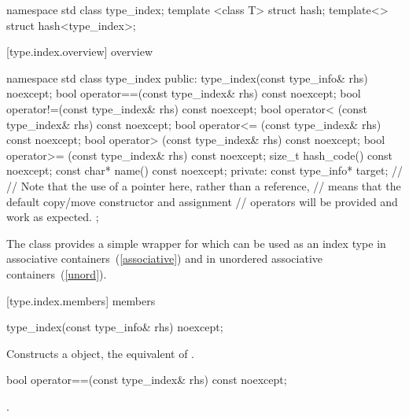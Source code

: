 %
%
\begin{codeblock}
namespace std {
  class type_index;
  template <class T> struct hash;
  template<> struct hash<type_index>;
}
\end{codeblock}

[type.index.overview]{ overview}

%
\begin{codeblock}
namespace std {
  class type_index {
  public:
    type_index(const type_info& rhs) noexcept;
    bool operator==(const type_index& rhs) const noexcept;
    bool operator!=(const type_index& rhs) const noexcept;
    bool operator< (const type_index& rhs) const noexcept;
    bool operator<= (const type_index& rhs) const noexcept;
    bool operator> (const type_index& rhs) const noexcept;
    bool operator>= (const type_index& rhs) const noexcept;
    size_t hash_code() const noexcept;
    const char* name() const noexcept;
  private:
    const type_info* target;    // \expos
    // Note that the use of a pointer here, rather than a reference,
    // means that the default copy/move constructor and assignment
    // operators will be provided and work as expected.
  };
}
\end{codeblock}

\pnum
The class  provides a simple wrapper for
 which can be used as an index type in associative
containers~(\ref{associative}) and in unordered associative
containers~(\ref{unord}).

[type.index.members]{ members}

%
\begin{itemdecl}
type_index(const type_info& rhs) noexcept;
\end{itemdecl}

\begin{itemdescr}
\pnum
\effects Constructs a  object, the equivalent of .
\end{itemdescr}

%
\begin{itemdecl}
bool operator==(const type_index& rhs) const noexcept;
\end{itemdecl}

\begin{itemdescr}
\pnum
\returns {}.
\end{itemdescr}

